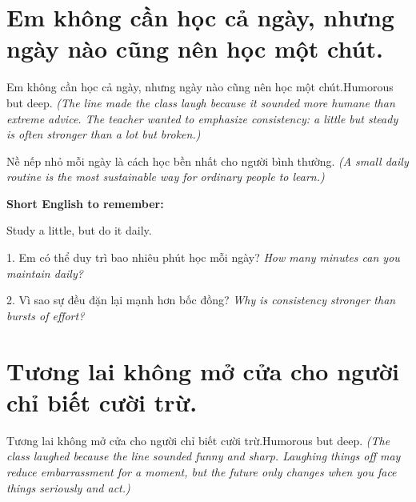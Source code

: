 \section{Em không cần học cả ngày, nhưng ngày nào cũng nên học một chút.}
\begin{truyen}{Em không cần học cả ngày, nhưng ngày nào cũng nên học một chút.}{Humorous but deep.}
\textit{(The line made the class laugh because it sounded more humane than extreme advice. The teacher wanted to emphasize consistency: a little but steady is often stronger than a lot but broken.)}
\end{truyen}

\begin{baihoc}
Nề nếp nhỏ mỗi ngày là cách học bền nhất cho người bình thường.
\textit{(A small daily routine is the most sustainable way for ordinary people to learn.)}
\end{baihoc}

\begin{ghinhoanh}
\textbf{Short English to remember:}

Study a little, but do it daily.

\end{ghinhoanh}

\begin{tuhocnhanh}
1. Em có thể duy trì bao nhiêu phút học mỗi ngày? \textit{How many minutes can you maintain daily?}

2. Vì sao sự đều đặn lại mạnh hơn bốc đồng? \textit{Why is consistency stronger than bursts of effort?}
\end{tuhocnhanh}
\ngancach

\section{Tương lai không mở cửa cho người chỉ biết cười trừ.}
\begin{truyen}{Tương lai không mở cửa cho người chỉ biết cười trừ.}{Humorous but deep.}
\textit{(The class laughed because the line sounded funny and sharp. Laughing things off may reduce embarrassment for a moment, but the future only changes when you face things seriously and act.)}
\end{truyen}

